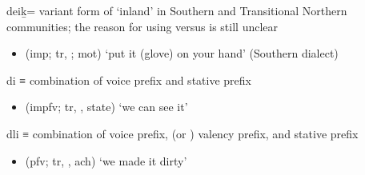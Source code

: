 \documentclass[12pt,letterpaper,oneside,article]{memoir}
\begin{document}
\begin{morphdesc}[resume*=alphalist]
\item[deiḵ=]
	variant form of  ‘inland’ in Southern and Transitional Northern communities;
	the reason for using  versus  is still unclear
	\begin{itemize}
	\item	{} (imp; tr, ; mot) ‘put it (glove) on your hand’
		(Southern dialect) %
		\parencite[05/79]{leer:1973}
	\end{itemize}

\item[di]
	≡ 
	combination of  voice prefix
		and  stative prefix
	\begin{itemize}
	\item	{} (impfv; tr, ,  state) ‘we can see it’
	\end{itemize}

\item[dli]
	≡ 
	combination of  voice prefix,
		 (or ) valency prefix,
		and  stative prefix
	\begin{itemize}
	\item	{} (pfv; tr, , ach) ‘we made it dirty’
	\end{itemize}


\end{morphdesc}
\end{document}
